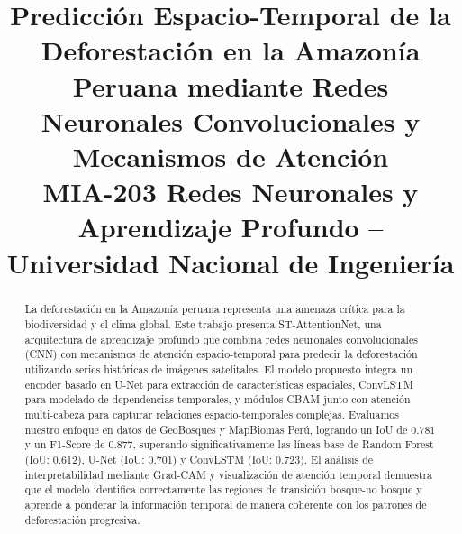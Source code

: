 \documentclass[conference]{IEEEtran}
\begin{document}
\title{Predicción Espacio-Temporal de la Deforestación en la Amazonía Peruana mediante Redes Neuronales Convolucionales y Mecanismos de Atención\\
{\footnotesize MIA-203 Redes Neuronales y Aprendizaje Profundo -- Universidad Nacional de Ingeniería}
}

\author{
\and
{}
\and
{}
}

\maketitle

\begin{abstract}
La deforestación en la Amazonía peruana representa una amenaza crítica para la biodiversidad y el clima global. Este trabajo presenta ST-AttentionNet, una arquitectura de aprendizaje profundo que combina redes neuronales convolucionales (CNN) con mecanismos de atención espacio-temporal para predecir la deforestación utilizando series históricas de imágenes satelitales. El modelo propuesto integra un encoder basado en U-Net para extracción de características espaciales, ConvLSTM para modelado de dependencias temporales, y módulos CBAM junto con atención multi-cabeza para capturar relaciones espacio-temporales complejas. Evaluamos nuestro enfoque en datos de GeoBosques y MapBiomas Perú, logrando un IoU de 0.781 y un F1-Score de 0.877, superando significativamente las líneas base de Random Forest (IoU: 0.612), U-Net (IoU: 0.701) y ConvLSTM (IoU: 0.723). El análisis de interpretabilidad mediante Grad-CAM y visualización de atención temporal demuestra que el modelo identifica correctamente las regiones de transición bosque-no bosque y aprende a ponderar la información temporal de manera coherente con los patrones de deforestación progresiva.
\end{abstract}
\end{document}
